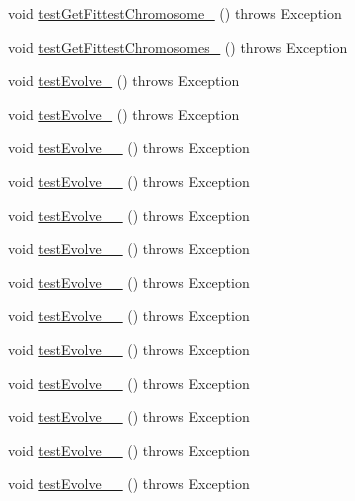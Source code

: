 \begin{DoxyCompactItemize}
void \hyperlink{classorg_1_1jgap_1_1_genotype_test_a24ebd52f2d4dcf01ad49476b8b0a80da}{test\-Get\-Fittest\-Chromosome\-\_} ()  throws Exception 
\item 
void \hyperlink{classorg_1_1jgap_1_1_genotype_test_a261e55a1dc12032a9a98da8bf25b3063}{test\-Get\-Fittest\-Chromosomes\-\_} ()  throws Exception 
\item 
void \hyperlink{classorg_1_1jgap_1_1_genotype_test_a3160ce403c1bf3d11d0d0d6e4401db92}{test\-Evolve\-\_} ()  throws Exception 
\item 
void \hyperlink{classorg_1_1jgap_1_1_genotype_test_a5ff34d5701b5d5406cf943adafa02345}{test\-Evolve\-\_} ()  throws Exception 
\item 
void \hyperlink{classorg_1_1jgap_1_1_genotype_test_a0e38964a67376954628482e58c5b16dc}{test\-Evolve\-\_\-\_} ()  throws Exception 
\item 
void \hyperlink{classorg_1_1jgap_1_1_genotype_test_a063c64798dc21f677ec7bab6eff41e05}{test\-Evolve\-\_\-\_} ()  throws Exception 
\item 
void \hyperlink{classorg_1_1jgap_1_1_genotype_test_a979315bbaae11902f17e2dd3143875aa}{test\-Evolve\-\_\-\_} ()  throws Exception 
\item 
void \hyperlink{classorg_1_1jgap_1_1_genotype_test_a2b4e6ae5f3c7e673b0936903599f82e1}{test\-Evolve\-\_\-\_} ()  throws Exception 
\item 
void \hyperlink{classorg_1_1jgap_1_1_genotype_test_ac8d9f3aeb6cb6b00bcbfe07836b1ebcc}{test\-Evolve\-\_\-\_} ()  throws Exception 
\item 
void \hyperlink{classorg_1_1jgap_1_1_genotype_test_a8512c2c3cac06353828a5768b982470a}{test\-Evolve\-\_\-\_} ()  throws Exception 
\item 
void \hyperlink{classorg_1_1jgap_1_1_genotype_test_a2df87c21e9656e18dd8b991f3ac29edc}{test\-Evolve\-\_\-\_} ()  throws Exception 
\item 
void \hyperlink{classorg_1_1jgap_1_1_genotype_test_a785e85f39262e23c8d2e896d9bd146bf}{test\-Evolve\-\_\-\_} ()  throws Exception 
\item 
void \hyperlink{classorg_1_1jgap_1_1_genotype_test_a7bc96cd22376515ce0ed80b0058a60ff}{test\-Evolve\-\_\-\_} ()  throws Exception 
\item 
void \hyperlink{classorg_1_1jgap_1_1_genotype_test_a3b1c249a793d0a2bd5cbc4357ddeae81}{test\-Evolve\-\_\-\_} ()  throws Exception 
\item 
void \hyperlink{classorg_1_1jgap_1_1_genotype_test_af342034e3811e55d6cfdb8fab90c972c}{test\-Evolve\-\_\-\_} ()  throws Exception 

\end{DoxyCompactItemize}
